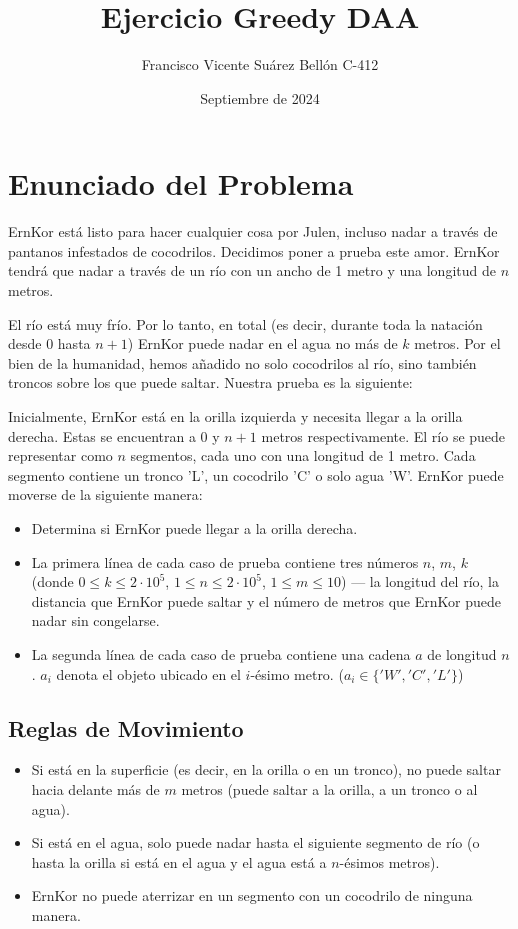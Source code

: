 \documentclass{article}
\title{Ejercicio Greedy DAA}
\author{Francisco Vicente Suárez Bellón C-412}
\date{Septiembre de 2024}
\begin{document}
\maketitle
\newpage
\tableofcontents %
\newpage

\section{Enunciado del Problema}

ErnKor está listo para hacer cualquier cosa por Julen, incluso nadar a través de pantanos infestados de cocodrilos. Decidimos poner a prueba este amor. ErnKor tendrá que nadar a través de un río con un ancho de 1 metro y una longitud de \(n\) metros.

El río está muy frío. Por lo tanto, en total (es decir, durante toda la natación desde 0 hasta \(n+1\)) ErnKor puede nadar en el agua no más de \(k\) metros. Por el bien de la humanidad, hemos añadido no solo cocodrilos al río, sino también troncos sobre los que puede saltar. Nuestra prueba es la siguiente:

Inicialmente, ErnKor está en la orilla izquierda y necesita llegar a la orilla derecha. Estas se encuentran a 0 y \(n+1\) metros respectivamente. El río se puede representar como \(n\) segmentos, cada uno con una longitud de 1 metro. Cada segmento contiene un tronco 'L', un cocodrilo 'C' o solo agua 'W'. ErnKor puede moverse de la siguiente manera:

\begin{itemize}
    \item Determina si ErnKor puede llegar a la orilla derecha.
    \item La primera línea de cada caso de prueba contiene tres números \(n\), \(m\), \(k\) (donde \(0 \leq k \leq 2 \cdot 10^5\), \(1 \leq n \leq 2 \cdot 10^5\), \(1 \leq m \leq 10\)) — la longitud del río, la distancia que ErnKor puede saltar y el número de metros que ErnKor puede nadar sin congelarse.
    \item La segunda línea de cada caso de prueba contiene una cadena \(a\) de longitud \(n\). \(a_i\) denota el objeto ubicado en el \(i\)-ésimo metro. (\(a_i \in \{ 'W', 'C', 'L' \}\))
\end{itemize}

\subsection{Reglas de Movimiento}
\begin{itemize}
    \item Si está en la superficie (es decir, en la orilla o en un tronco), no puede saltar hacia delante más de \(m\) metros (puede saltar a la orilla, a un tronco o al agua).
    \item Si está en el agua, solo puede nadar hasta el siguiente segmento de río (o hasta la orilla si está en el agua y el agua está a \(n\)-ésimos metros).
    \item ErnKor no puede aterrizar en un segmento con un cocodrilo de ninguna manera.
\end{itemize}
\end{document}
